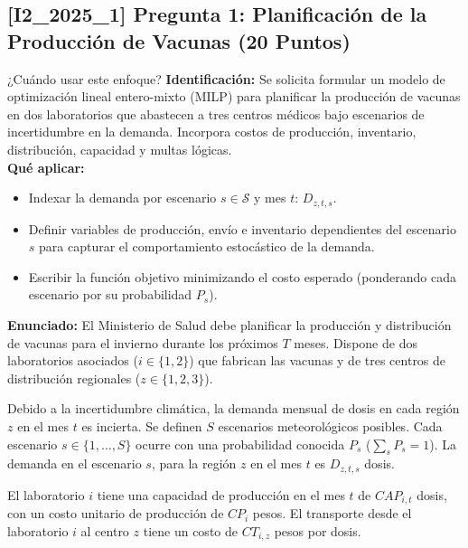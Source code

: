\documentclass[11pt, a4paper]{article}
\begin{document}
\subsection*{[I2_2025_1] Pregunta 1: Planificación de la Producción de Vacunas (20 Puntos)}
\begin{tipprueba}{¿Cuándo usar este enfoque?}
    \textbf{Identificación:} Se solicita formular un modelo de optimización lineal entero-mixto (MILP) para planificar la producción de vacunas en dos laboratorios que abastecen a tres centros médicos bajo escenarios de incertidumbre en la demanda. Incorpora costos de producción, inventario, distribución, capacidad y multas lógicas.\\
    \textbf{Qué aplicar:}
    \begin{itemize}
      \item Indexar la demanda por escenario $s \in \mathcal{S}$ y mes $t$: $D_{z,t,s}$.
      \item Definir variables de producción, envío e inventario dependientes del escenario $s$ para capturar el comportamiento estocástico de la demanda.
      \item Escribir la función objetivo minimizando el costo esperado (ponderando cada escenario por su probabilidad $P_s$).
    \end{itemize}
  \end{tipprueba}

  \textbf{Enunciado:}
  El Ministerio de Salud debe planificar la producción y distribución de vacunas para el invierno durante los próximos $T$ meses. Dispone de dos laboratorios asociados ($i \in \{1, 2\}$) que fabrican las vacunas y de tres centros de distribución regionales ($z \in \{1, 2, 3\}$). 

  Debido a la incertidumbre climática, la demanda mensual de dosis en cada región $z$ en el mes $t$ es incierta. Se definen $S$ escenarios meteorológicos posibles. Cada escenario $s \in \{1, \dots, S\}$ ocurre con una probabilidad conocida $P_s$ ($\sum_s P_s = 1$). La demanda en el escenario $s$, para la región $z$ en el mes $t$ es $D_{z,t,s}$ dosis.

  El laboratorio $i$ tiene una capacidad de producción en el mes $t$ de $CAP_{i,t}$ dosis, con un costo unitario de producción de $CP_i$ pesos. El transporte desde el laboratorio $i$ al centro $z$ tiene un costo de $CT_{i,z}$ pesos por dosis. 
  
\end{document}
